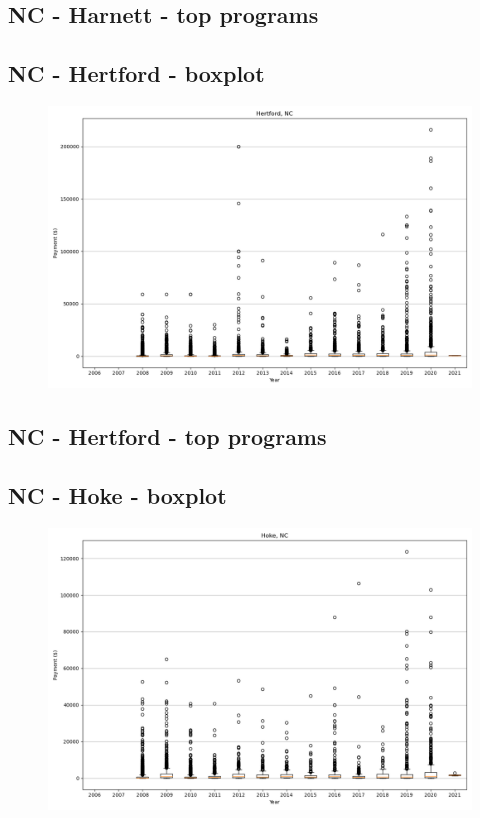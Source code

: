 \subsection*{NC - Harnett - top programs}

\newpage
\subsection*{NC - Hertford - boxplot}
\begin{figure}[h]
\centering
\includegraphics[width=7in]{../output/boxplots/counties/Hertford-NC_boxplot.png}
\end{figure}


\subsection*{NC - Hertford - top programs}

\newpage
\subsection*{NC - Hoke - boxplot}
\begin{figure}[h]
\centering
\includegraphics[width=7in]{../output/boxplots/counties/Hoke-NC_boxplot.png}
\end{figure}


